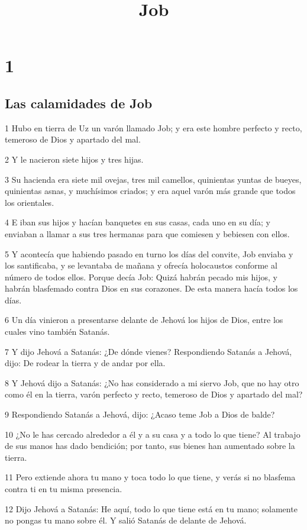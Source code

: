 

\title{Job}

\chapter{1}

\section*{Las calamidades de Job}

\par 1 Hubo en tierra de Uz un varón llamado Job; y era este hombre perfecto y recto, temeroso de Dios y apartado del mal.
\par 2 Y le nacieron siete hijos y tres hijas.
\par 3 Su hacienda era siete mil ovejas, tres mil camellos, quinientas yuntas de bueyes, quinientas asnas, y muchísimos criados; y era aquel varón más grande que todos los orientales.
\par 4 E iban sus hijos y hacían banquetes en sus casas, cada uno en su día; y enviaban a llamar a sus tres hermanas para que comiesen y bebiesen con ellos.
\par 5 Y acontecía que habiendo pasado en turno los días del convite, Job enviaba y los santificaba, y se levantaba de mañana y ofrecía holocaustos conforme al número de todos ellos. Porque decía Job: Quizá habrán pecado mis hijos, y habrán blasfemado contra Dios en sus corazones. De esta manera hacía todos los días.
\par 6 Un día vinieron a presentarse delante de Jehová los hijos de Dios, entre los cuales vino también Satanás.
\par 7 Y dijo Jehová a Satanás: ¿De dónde vienes? Respondiendo Satanás a Jehová, dijo: De rodear la tierra y de andar por ella. 
\par 8 Y Jehová dijo a Satanás: ¿No has considerado a mi siervo Job, que no hay otro como él en la tierra, varón perfecto y recto, temeroso de Dios y apartado del mal?
\par 9 Respondiendo Satanás a Jehová, dijo: ¿Acaso teme Job a Dios de balde?
\par 10 ¿No le has cercado alrededor a él y a su casa y a todo lo que tiene? Al trabajo de sus manos has dado bendición; por tanto, sus bienes han aumentado sobre la tierra.
\par 11 Pero extiende ahora tu mano y toca todo lo que tiene, y verás si no blasfema contra ti en tu misma presencia. 
\par 12 Dijo Jehová a Satanás: He aquí, todo lo que tiene está en tu mano; solamente no pongas tu mano sobre él. Y salió Satanás de delante de Jehová.
